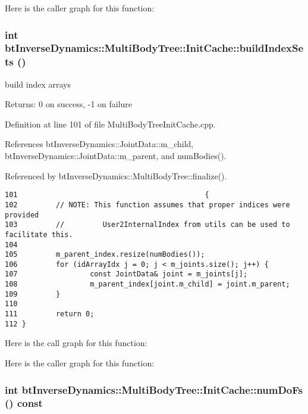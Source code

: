 Here is the caller graph for this function:\hypertarget{classbt_inverse_dynamics_1_1_multi_body_tree_1_1_init_cache_41e961d85dcd9e9f9aa9b18ac33289c9}{
\subsubsection[buildIndexSets]{\setlength{\rightskip}{0pt plus 5cm}int btInverseDynamics::MultiBodyTree::InitCache::buildIndexSets ()}}
\label{classbt_inverse_dynamics_1_1_multi_body_tree_1_1_init_cache_41e961d85dcd9e9f9aa9b18ac33289c9}


build index arrays \begin{Desc}
\item[Returns:]0 on success, -1 on failure \end{Desc}


Definition at line 101 of file MultiBodyTreeInitCache.cpp.

References btInverseDynamics::JointData::m\_\-child, btInverseDynamics::JointData::m\_\-parent, and numBodies().

Referenced by btInverseDynamics::MultiBodyTree::finalize().

\begin{Code}\begin{verbatim}101                                            {
102         // NOTE: This function assumes that proper indices were provided
103         //         User2InternalIndex from utils can be used to facilitate this.
104 
105         m_parent_index.resize(numBodies());
106         for (idArrayIdx j = 0; j < m_joints.size(); j++) {
107                 const JointData& joint = m_joints[j];
108                 m_parent_index[joint.m_child] = joint.m_parent;
109         }
110 
111         return 0;
112 }
\end{verbatim}
\end{Code}




Here is the call graph for this function:

Here is the caller graph for this function:\hypertarget{classbt_inverse_dynamics_1_1_multi_body_tree_1_1_init_cache_38d366cfeb082b06f72eff27befae30b}{
\subsubsection[numDoFs]{\setlength{\rightskip}{0pt plus 5cm}int btInverseDynamics::MultiBodyTree::InitCache::numDoFs () const}}
\label{classbt_inverse_dynamics_1_1_multi_body_tree_1_1_init_cache_38d366cfeb082b06f72eff27befae30b}


